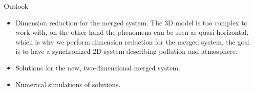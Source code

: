 \documentclass{beamer}
\begin{document}
\begin{frame}{Outlook}
  \begin{itemize}
  \item Dimension reduction for the merged system. The 3D model is too complex to work with, on the other hand the phenomena can be seen as quasi-horizontal, which is why we perform dimension reduction for the merged system, the goal is to have a synchronized 2D system describing pollution and atmosphere.
  \item Solutions for the new, two-dimensional merged system.
  \item Numerical simulations of solutions.
  \end{itemize}
\end{frame}
\end{document}
